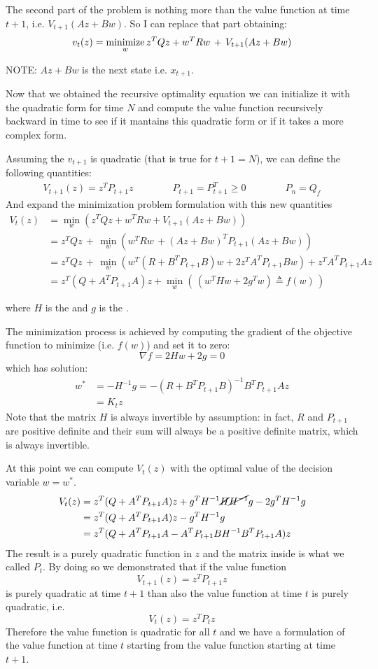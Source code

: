 The second part of the problem is nothing more than the value function at time $t+1$, i.e. $V_{t+1}(Az+Bw)$. So I can replace that part obtaining:
\[v_t(z) = \operatorname*{minimize}_w z^TQz+w^TRw\,+\,V_{t+1}(Az+Bw)\]

NOTE: $Az + Bw$ is the next state i.e. $x_{t+1}$.

Now that we obtained the recursive optimality equation we can initialize it with the quadratic form for time $N$ and compute the value function recursively backward in time to see if it mantains this quadratic form or if it takes a  more complex form.

Assuming the $v_{t+1}$ is quadratic (that is true for $t+1 = N$), we can define the following quantities:
\begin{gather*}
V_{t+1}(z) = z^TP_{t+1}z\qquad\qquad P_{t+1} = P_{t+1}^T\ge 0 \qquad\qquad P_n=Q_f
\end{gather*}
And expand the minimization problem formulation with this new quantities
\begin{align*}
V_t(z) &= \min_w (z^TQz + w^TRw + V_{t+1}(Az+Bw))\\
&=z^TQz\,+\,\min_w(w^TRw\,+(Az+Bw)^TP_{t+1}(Az+Bw))\\
&=z^TQz\,+\,\min_w(w^T(R+B^TP_{t+1}B)w + 2z^TA^TP_{t+1}Bw) + z^TA^TP_{t+1}Az\\
&=z^T(Q+A^TP_{t+1}A)z + \min_w(\,(w^THw + 2g^Tw)\triangleq f(w)\,)
\end{align*}

where $H$ is the  and $g$ is the .

The minimization process is achieved by computing the gradient of the objective function to minimize (i.e. $f(w)$) and set it to zero:
\[\nabla f=2Hw+2g=0\]
which has solution:
\begin{align*}
w^* &= -H^{-1}g = -(R+B^TP_{t+1}B)^{-1}B^TP_{t+1}Az\\
&=K_tz
\end{align*}
Note that the matrix $H$ is always invertible by assumption: in fact, $R$ and $P_{t+1}$ are positive definite and their sum will always be a positive definite matrix, which is always invertible.

At this point we can compute $V_t(z)$ with the optimal value of the decision variable $w = w^*$.
\begin{align*}
V_t(z) &= z^T(Q+A^TP_{t+1}A)z + g^TH^{-1}\cancel{H}\cancel{H^{-1}}g -2g^TH^{-1}g\\
&=z^T(Q+A^TP_{t+1}A)z  - g^TH^{-1}g\\
&=z^T(Q + A^TP_{t+1}A - A^TP_{t+1}BH^{-1}B^TP_{t+1}A)z
\end{align*}
The result is a purely quadratic function in $z$ and the matrix inside is what we called $P_t$. By doing so we demonstrated that if the value function
\[V_{t+1}(z) = z^TP_{t+1}z\]
is purely quadratic at time $t+1$ than also the value function at time $t$ is purely quadratic, i.e.
\[V_t(z) = z^TP_tz\]
Therefore the value function is quadratic for all $t$ and we have a formulation of the value function at time $t$ starting from the value function starting at time $t+1$.

